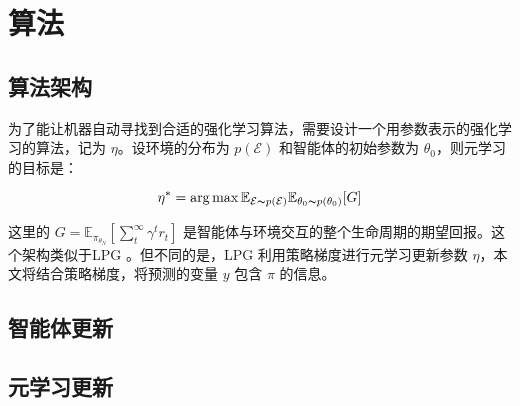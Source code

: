\chapter{算法}
\label{cha:usage-example}

\section{算法架构}
为了能让机器自动寻找到合适的强化学习算法，需要设计一个用参数表示的强化学习的算法，记为 $\eta$。设环境的分布为 $p(\mathcal{E})$ 和智能体的初始参数为 $\theta_0$，则元学习的目标是：

\begin{equation}
    \eta^* = \arg \max \mathbb{E}_{\mathcal{E} \thicksim p(\mathcal{E})} \mathbb{E}_{\theta_0 \thicksim p(\theta_0)} [G]
\end{equation}

这里的 $G=\mathbb{E}_{\pi_{\theta_N} } [\sum_t^\infty \gamma^t r_t]$ 是智能体与环境交互的整个生命周期的期望回报。这个架构类似于LPG \cite{ohDiscoveringReinforcementLearning2020}。但不同的是，LPG 利用策略梯度进行元学习更新参数 $\eta$，本文将结合策略梯度，将预测的变量 $y$ 包含 $\pi$ 的信息。

\section{智能体更新}



\section{元学习更新}

